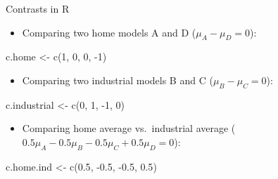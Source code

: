 \documentclass[
  ignorenonframetext,
]{beamer}
\newenvironment{Shaded}{\begin{snugshade}}{\end{snugshade}}
\newcommand{\DecValTok}[1]{\textcolor[rgb]{0.68,0.00,0.00}{#1}}
\newcommand{\FloatTok}[1]{\textcolor[rgb]{0.68,0.00,0.00}{#1}}
\newcommand{\FunctionTok}[1]{\textcolor[rgb]{0.28,0.35,0.67}{#1}}
\newcommand{\NormalTok}[1]{\textcolor[rgb]{0.00,0.23,0.31}{#1}}
\newcommand{\OtherTok}[1]{\textcolor[rgb]{0.00,0.23,0.31}{#1}}
\newcommand{\SpecialCharTok}[1]{\textcolor[rgb]{0.37,0.37,0.37}{#1}}
\providecommand{\tightlist}{%
  \setlength{\itemsep}{0pt}\setlength{\parskip}{0pt}}\usepackage{longtable,booktabs,array}
\begin{document}
\begin{frame}[fragile]{Contrasts in R}
\protect\hypertarget{contrasts-in-r}{}
\begin{itemize}
\tightlist
\item
  Comparing two home models A and D (\(\mu_A-\mu_D=0\)):
\end{itemize}

\begin{Shaded}
\begin{Highlighting}[]
\NormalTok{c.home }\OtherTok{\textless{}{-}} \FunctionTok{c}\NormalTok{(}\DecValTok{1}\NormalTok{, }\DecValTok{0}\NormalTok{, }\DecValTok{0}\NormalTok{, }\SpecialCharTok{{-}}\DecValTok{1}\NormalTok{)}
\end{Highlighting}
\end{Shaded}

\begin{itemize}
\tightlist
\item
  Comparing two industrial models B and C (\(\mu_B-\mu_C=0\)):
\end{itemize}

\begin{Shaded}
\begin{Highlighting}[]
\NormalTok{c.industrial }\OtherTok{\textless{}{-}} \FunctionTok{c}\NormalTok{(}\DecValTok{0}\NormalTok{, }\DecValTok{1}\NormalTok{, }\SpecialCharTok{{-}}\DecValTok{1}\NormalTok{, }\DecValTok{0}\NormalTok{)}
\end{Highlighting}
\end{Shaded}

\begin{itemize}
\tightlist
\item
  Comparing home average vs.~industrial average
  (\(0.5\mu_A-0.5\mu_B-0.5\mu_C+0.5\mu_D=0\)):
\end{itemize}

\begin{Shaded}
\begin{Highlighting}[]
\NormalTok{c.home.ind }\OtherTok{\textless{}{-}} \FunctionTok{c}\NormalTok{(}\FloatTok{0.5}\NormalTok{, }\SpecialCharTok{{-}}\FloatTok{0.5}\NormalTok{, }\SpecialCharTok{{-}}\FloatTok{0.5}\NormalTok{, }\FloatTok{0.5}\NormalTok{)}
\end{Highlighting}
\end{Shaded}
\end{frame}
\end{document}

